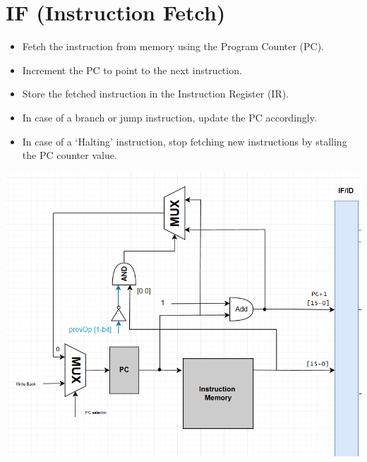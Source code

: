 \documentclass{report}
\begin{document}
\section*{IF (Instruction Fetch)}
\begin{minipage}{0.6\textwidth}
\begin{itemize}
    \item Fetch the instruction from memory using the Program Counter (PC).
    \item Increment the PC to point to the next instruction.
    \item Store the fetched instruction in the Instruction Register (IR).
    \item In case of a branch or jump instruction, update the PC accordingly.
    \item In case of a `Halting' instruction, stop fetching new instructions by stalling the PC counter value.
\end{itemize}
\end{minipage}
\begin{minipage}{0.35\textwidth}
\begin{center}
    \includegraphics[width=\textwidth]{./assets/IF.png}
\end{center}
\end{minipage}
\end{document}
